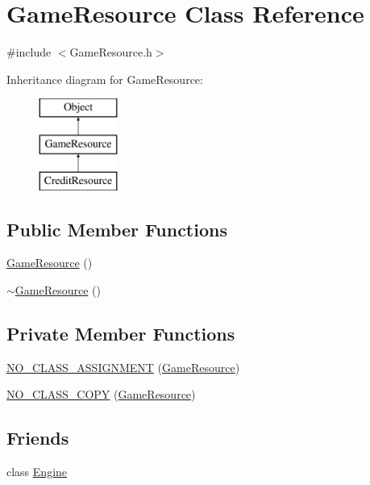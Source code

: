 \section{Game\-Resource Class Reference}
\label{class_game_resource}


{\ttfamily \#include $<$Game\-Resource.\-h$>$}

Inheritance diagram for Game\-Resource\-:\begin{figure}[H]
\begin{center}
\leavevmode
\includegraphics[height=3.000000cm]{class_game_resource}
\end{center}
\end{figure}
\subsection*{Public Member Functions}
\begin{DoxyCompactItemize}
\item 
\hyperlink{class_game_resource_aa9a7ea51a3b3e8454cc1debd76580126}{Game\-Resource} ()
\item 
\hyperlink{class_game_resource_a24ad378be4683037bfddb7f71f7aa377}{$\sim$\-Game\-Resource} ()
\end{DoxyCompactItemize}
\subsection*{Private Member Functions}
\begin{DoxyCompactItemize}
\item 
\hyperlink{class_game_resource_ae381d69d42b9be0af3e5870774c4a1ea}{N\-O\-\_\-\-C\-L\-A\-S\-S\-\_\-\-A\-S\-S\-I\-G\-N\-M\-E\-N\-T} (\hyperlink{class_game_resource}{Game\-Resource})
\item 
\hyperlink{class_game_resource_ad6d0c8132523d571b9db52ec09d0b7f0}{N\-O\-\_\-\-C\-L\-A\-S\-S\-\_\-\-C\-O\-P\-Y} (\hyperlink{class_game_resource}{Game\-Resource})
\end{DoxyCompactItemize}
\subsection*{Friends}
\begin{DoxyCompactItemize}
\item 
class \hyperlink{class_game_resource_a3e1914489e4bed4f9f23cdeab34a43dc}{Engine}
\end{DoxyCompactItemize}


